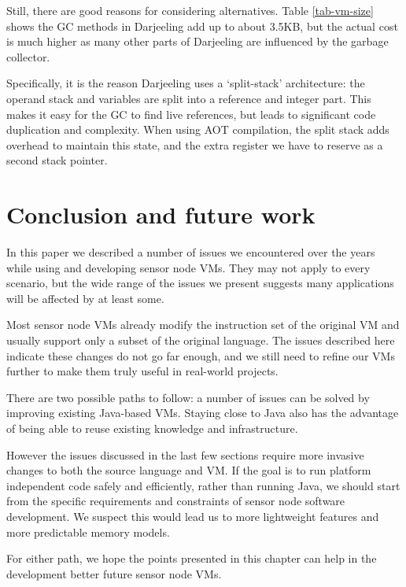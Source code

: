 Still, there are good reasons for considering alternatives. Table \ref{tab-vm-size} shows the GC methods in Darjeeling add up to about 3.5KB, but the actual cost is much higher as many other parts of Darjeeling are influenced by the garbage collector.

Specifically, it is the reason Darjeeling uses a `split-stack' architecture: the operand stack and variables are split into a reference and integer part. This makes it easy for the GC to find live references, but leads to significant code duplication and complexity. When using AOT compilation, the split stack adds overhead to maintain this state, and the extra register we have to reserve as a second stack pointer.



\section{Conclusion and future work}
In this paper we described a number of issues we encountered over the years while using and developing sensor node VMs. They may not apply to every scenario, but the wide range of the issues we present suggests many applications will be affected by at least some.

Most sensor node VMs already modify the instruction set of the original VM and usually support only a subset of the original language. The issues described here indicate these changes do not go far enough, and we still need to refine our VMs further to make them truly useful in real-world projects.

There are two possible paths to follow: a number of issues can be solved by improving existing Java-based VMs. Staying close to Java also has the advantage of being able to reuse existing knowledge and infrastructure.

However the issues discussed in the last few sections require more invasive changes to both the source language and VM. If the goal is to run platform independent code safely and efficiently, rather than running Java, we should start from the specific requirements and constraints of sensor node software development. We suspect this would lead us to more lightweight features and more predictable memory models.

For either path, we hope the points presented in this chapter can help in the development better future sensor node VMs.
